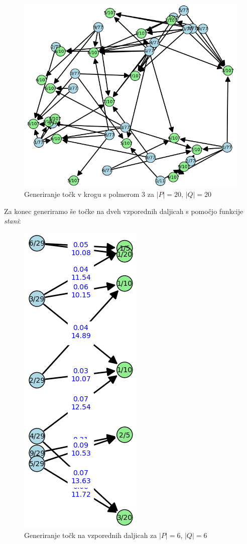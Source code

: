 \documentclass[a4paper, 11pt]{article}
\begin{document}
\begin{figure}[h!]
    \centering
    \includegraphics[scale=0.56]{krog2.png}
    \caption{Generiranje točk v krogu s polmerom 3 za $|P|=20$, $|Q|=20$}
\end{figure}
\pagebreak
\noindent
Za konec generiramo še točke na dveh vzporednih daljicah s pomočjo funkcije \emph{stani}:
\begin{figure}[h!]
    \centering
    \includegraphics[scale=0.56]{stran.png}
    \caption{Generiranje točk na vzporednih daljicah za $|P|=6$, $|Q|=6$}
\end{figure}
\end{document}
